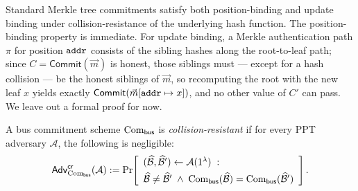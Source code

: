 \begin{remark}
Standard Merkle tree commitments satisfy both position-binding and update
binding under collision-resistance of the underlying hash function.  The
position-binding property is immediate.  For update binding, a Merkle
authentication path $\pi$ for position $\mathtt{addr}$ consists of the sibling hashes
along the root-to-leaf path; since $C=\mathsf{Commit}(\vec{m})$ is honest, those
siblings must --- except for a hash collision --- be the honest siblings of
$\vec{m}$, so recomputing the root with the new leaf $x$ yields exactly
$\mathsf{Commit}(\vec{m}[\mathtt{addr}\mapsto x])$, and no other value of $C'$ can pass.
We leave out a formal proof for now.
\end{remark}

\begin{definition}\label{def:bus-cr}
A bus commitment scheme $\mathrm{Com}_{\mathsf{bus}}$ is \emph{collision-resistant} if for every PPT adversary $\mathcal{A}$, the following is negligible:
\[
\mathsf{Adv}^{\mathsf{cr}}_{\mathrm{Com}_{\mathsf{bus}}}(\mathcal{A}):= \Pr\!\left[\begin{array}{l}
    (\widehat{\mathcal{B}},\widehat{\mathcal{B}}') \leftarrow \mathcal{A}(1^\lambda) \;:\; \\[4pt]
    \widehat{\mathcal{B}}\neq\widehat{\mathcal{B}}' \;\wedge\;
    \mathrm{Com}_{\mathsf{bus}}(\widehat{\mathcal{B}})=\mathrm{Com}_{\mathsf{bus}}(\widehat{\mathcal{B}}')
  \end{array}\right].
\]
\end{definition}



